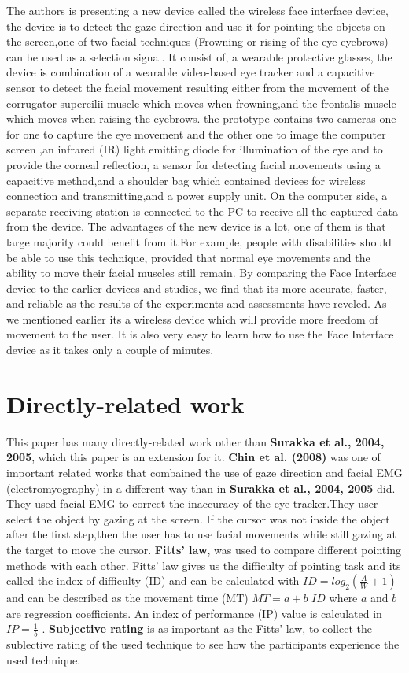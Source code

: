 \documentclass[a4paper]{article}
\begin{document}
The authors is presenting a new device called the wireless face interface device, the device is to detect the gaze direction and use it for pointing the 
objects on the screen,one of two facial techniques (Frowning or rising of the eye eyebrows) can be used as a selection signal. It consist of, a wearable 
protective glasses, the device is combination of a wearable video-based eye tracker and a capacitive sensor to detect the facial movement resulting either 
from the movement of the corrugator supercilii muscle which moves when frowning,and the frontalis muscle which moves when raising the eyebrows. the 
prototype contains two cameras one for one to capture the eye movement and the other one to image the computer screen ,an infrared (IR) light emitting 
diode for illumination of the eye and to provide the corneal reflection, a sensor for detecting facial movements using a capacitive method,and a shoulder 
bag which contained devices for wireless connection and transmitting,and a power supply unit. On the computer side, a separate receiving station is 
connected to the PC to receive all the captured data from the device. The advantages of the new device is a lot, one of them is that large majority could 
benefit from it.For example, people with disabilities should be able to use this technique, provided that normal eye movements and the ability to
move their facial muscles still remain. By comparing the Face Interface device to the earlier devices and studies, we find that its more accurate, faster, 
and reliable as the results of the experiments and assessments have reveled. As we mentioned earlier its a wireless device which will provide more freedom 
of movement to the user. It is also very easy to learn how to use the Face Interface device as it takes only a couple of minutes.
 

\section{Directly-related work} 
This paper has many directly-related work other than {\bf Surakka et al., 2004, 2005}, which this paper is an extension for it.
{\bf Chin et al. (2008) } was one of important related works that combained the use of gaze direction and facial EMG (electromyography)
in a different way than in {\bf Surakka et al., 2004, 2005} did. They used facial EMG to correct the inaccuracy of the eye tracker.They user select 
the object by gazing at the screen. If the cursor was not inside the object after the first step,then the user has to use facial movements while still 
gazing at the target to move the cursor. {\bf Fitts' law}, was used to compare different pointing methods with each other. Fitts' law gives us the 
difficulty of pointing task and its called the index of difficulty (ID) and can be calculated with $ID = log_2(\frac{A}{W} + 1 ) $  	  
and can be described as the movement time (MT) $ MT = a + b$ $ID$ where $a$ and $b$ are regression coefficients. An index of performance (IP)
value is calculated in $IP = \frac{1}{b} $ . {\bf Subjective rating} is as important as the Fitts' law, to collect the sublective rating of the 
used technique to see how the participants experience the used technique.
\end{document}
